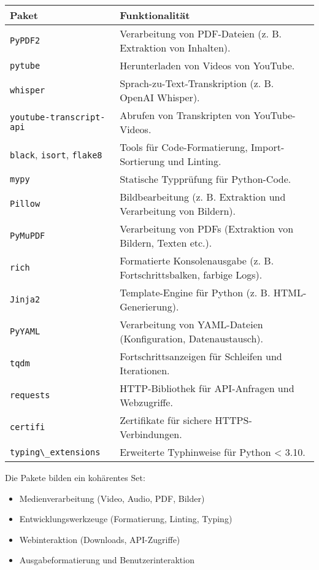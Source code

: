 \documentclass{vorlage-design-main}
\begin{document}
\begin{table}[ht]
  \begin{tabular}{@{}ll@{}}
\toprule
\textbf{Paket}
 &
\textbf{Funktionalität}
 \\
\midrule[\heavyrulewidth]
\verb|PyPDF2| & Verarbeitung von PDF-Dateien (z. B.
Extraktion von Inhalten). \\
\verb|pytube| & Herunterladen von Videos von
YouTube. \\
\verb|whisper| & Sprach-zu-Text-Transkription (z. B.
OpenAI Whisper). \\
\verb|youtube-transcript-api| & Abrufen von
Transkripten von YouTube-Videos. \\
\verb|black|, \verb|isort|,
\verb|flake8| & Tools für Code-Formatierung,
Import-Sortierung und Linting. \\
\verb|mypy| & Statische Typprüfung für
Python-Code. \\
\verb|Pillow| & Bildbearbeitung (z. B. Extraktion und
Verarbeitung von Bildern). \\
\verb|PyMuPDF| & Verarbeitung von PDFs (Extraktion
von Bildern, Texten etc.). \\
\verb|rich| & Formatierte Konsolenausgabe (z. B.
Fortschrittsbalken, farbige Logs). \\
\verb|Jinja2| & Template-Engine für Python (z. B.
HTML-Generierung). \\
\verb|PyYAML| & Verarbeitung von YAML-Dateien
(Konfiguration, Datenaustausch). \\
\verb|tqdm| & Fortschrittsanzeigen für Schleifen und
Iterationen. \\
\verb|requests| & HTTP-Bibliothek für API-Anfragen
und Webzugriffe. \\
\verb|certifi| & Zertifikate für sichere
HTTPS-Verbindungen. \\
\verb|typing\_extensions| & Erweiterte Typhinweise
für Python \textless{} 3.10. \\
\bottomrule
\end{tabular}%
\end{table}

Die Pakete bilden ein kohärentes Set:

\begin{itemize}

\item
  Medienverarbeitung (Video, Audio, PDF, Bilder)
\item
  Entwicklungswerkzeuge (Formatierung, Linting, Typing)
\item
  Webinteraktion (Downloads, API-Zugriffe)
\item
  Ausgabeformatierung und Benutzerinteraktion
\end{itemize}
\end{document}
